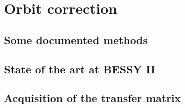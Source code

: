\section{Orbit correction}
\label{sec:correction}
\subsection{Some documented methods}
\subsection{State of the art at BESSY II}
\subsection{Acquisition of the transfer matrix}

